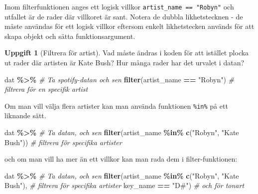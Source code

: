 \documentclass[
]{book}
\newenvironment{Shaded}{\begin{snugshade}}{\end{snugshade}}
\newcommand{\CommentTok}[1]{\textcolor[rgb]{0.56,0.35,0.01}{\textit{#1}}}
\newcommand{\FunctionTok}[1]{\textcolor[rgb]{0.13,0.29,0.53}{\textbf{#1}}}
\newcommand{\NormalTok}[1]{#1}
\newcommand{\SpecialCharTok}[1]{\textcolor[rgb]{0.81,0.36,0.00}{\textbf{#1}}}
\newcommand{\StringTok}[1]{\textcolor[rgb]{0.31,0.60,0.02}{#1}}
\theoremstyle{definition}
\theoremstyle{definition}
\theoremstyle{definition}
\newtheorem{exercise}{Uppgift}[chapter]
\theoremstyle{definition}
\theoremstyle{remark}
\begin{document}
Inom filterfunktionen anges ett logisk villkor \texttt{artist\_name\ ==\ "Robyn"} och utfallet är de rader där villkoret är sant. Notera de dubbla likhetstecknen - de måste användas för ett logisk villkor eftersom enkelt likhetstecken används för att skapa objekt och sätta funktionsargument.

\begin{exercise}[Filtrera för artist]

Vad måste ändras i koden för att istället plocka ut rader där artisten är Kate Bush? Hur många rader har det urvalet i datan?

\begin{Shaded}
\begin{Highlighting}[]
\NormalTok{dat }\SpecialCharTok{\%\textgreater{}\%}                                \CommentTok{\# Ta spotify{-}datan och sen}
  \FunctionTok{filter}\NormalTok{(artist\_name }\SpecialCharTok{==} \StringTok{"Robyn"}\NormalTok{)       }\CommentTok{\# filtrera för en specifik artist}
\end{Highlighting}
\end{Shaded}

\end{exercise}

Om man vill välja flera artister kan man använda funktionen \texttt{\%in\%} på ett liknande sätt.

\begin{Shaded}
\begin{Highlighting}[]
\NormalTok{dat }\SpecialCharTok{\%\textgreater{}\%}                                               \CommentTok{\# Ta datan, och sen}
  \FunctionTok{filter}\NormalTok{(artist\_name }\SpecialCharTok{\%in\%} \FunctionTok{c}\NormalTok{(}\StringTok{"Robyn"}\NormalTok{, }\StringTok{"Kate Bush"}\NormalTok{))    }\CommentTok{\# filtrera för specifika artister}
\end{Highlighting}
\end{Shaded}

och om man vill ha mer än ett villkor kan man rada dem i filter-funktionen:

\begin{Shaded}
\begin{Highlighting}[]
\NormalTok{dat }\SpecialCharTok{\%\textgreater{}\%}                                             \CommentTok{\# Ta datan, och sen}
  \FunctionTok{filter}\NormalTok{(artist\_name }\SpecialCharTok{\%in\%} \FunctionTok{c}\NormalTok{(}\StringTok{"Robyn"}\NormalTok{, }\StringTok{"Kate Bush"}\NormalTok{),  }\CommentTok{\# filtrera för specifika artister}
\NormalTok{         key\_name }\SpecialCharTok{==} \StringTok{"D\#"}\NormalTok{)                          }\CommentTok{\# och för tonart}
\end{Highlighting}
\end{Shaded}
\end{document}
